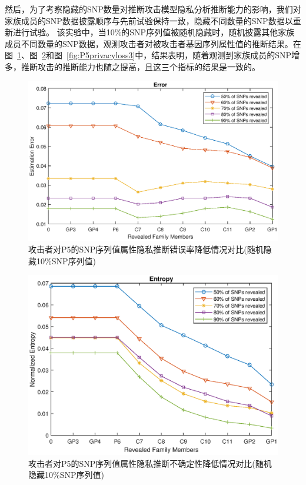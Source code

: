 然后，为了考察隐藏的SNP数量对推断攻击模型隐私分析推断能力的影响，我们对家族成员的SNP数据披露顺序与先前试验保持一致，隐藏不同数量的SNP数据以重新进行试验。 该实验中，当10\%的SNP序列值被随机隐藏时，随机披露其他家族成员不同数量的SNP数据，观测攻击者对被攻击者基因序列属性值的推断结果。在图~\ref{fig:P5error3}、图~\ref{fig:P5entropy3}和图~\ref{fig:P5privacyloss3}中，结果表明，随着观测到家族成员的SNP增多，推断攻击的推断能力也随之提高，且这三个指标的结果是一致的。

\begin{figure}[htbp]
	\centering
	\includegraphics[width=0.8\linewidth]{./figures/P5error3.eps}
	\centering
	\caption{攻击者对P5的SNP序列值属性隐私推断错误率降低情况对比(随机隐藏10\%SNP序列值)}\label{fig:P5error3}
\end{figure}


\begin{figure}[htbp]
	\centering
	\includegraphics[width=0.8\linewidth]{./figures/P5entropy3.eps}
	\centering
	\caption{攻击者对P5的SNP序列值属性隐私推断不确定性降低情况对比(随机隐藏10\%SNP序列值)}\label{fig:P5entropy3}
\end{figure}

